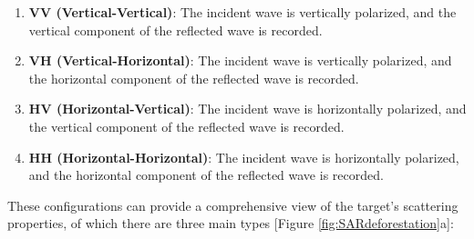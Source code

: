 \documentclass[
  12 pt,
]{Nemilov}
\providecommand{\tightlist}{%
  \setlength{\itemsep}{0pt}\setlength{\parskip}{0pt}}
\begin{document}
\begin{enumerate}
\def\labelenumi{\arabic{enumi}.}
\tightlist
\item
  \textbf{VV (Vertical-Vertical)}: The incident wave is vertically polarized, and the vertical component of the reflected wave is recorded.
\item
  \textbf{VH (Vertical-Horizontal)}: The incident wave is vertically polarized, and the horizontal component of the reflected wave is recorded.
\item
  \textbf{HV (Horizontal-Vertical)}: The incident wave is horizontally polarized, and the vertical component of the reflected wave is recorded.
\item
  \textbf{HH (Horizontal-Horizontal)}: The incident wave is horizontally polarized, and the horizontal component of the reflected wave is recorded.
\end{enumerate}

These configurations can provide a comprehensive view of the target's scattering properties, of which there are three main types {[}Figure \ref{fig:SARdeforestation}a{]}:
\end{document}
